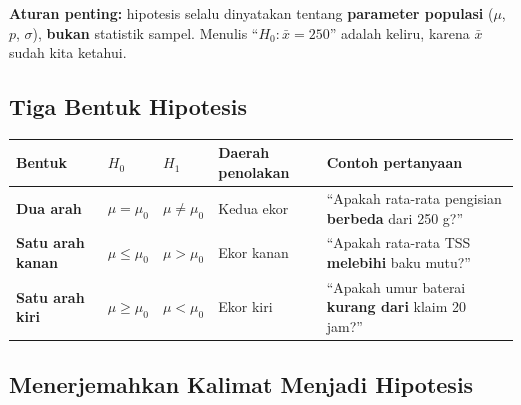 \documentclass[
  indonesian,
  letterpaper,
]{book}
\newcounter{none} %
\begin{document}
\textbf{Aturan penting:} hipotesis selalu dinyatakan tentang
\textbf{parameter populasi} (\(\mu\), \(p\), \(\sigma\)), \textbf{bukan}
statistik sampel. Menulis ``\(H_0: \bar{x} = 250\)'' adalah keliru,
karena \(\bar{x}\) sudah kita ketahui.

\subsection{Tiga Bentuk Hipotesis}\label{tiga-bentuk-hipotesis}

{\def\LTcaptype{none} %
\begin{longtable}[]{@{}
  >{\raggedright\arraybackslash}p{}
  >{\raggedright\arraybackslash}p{}
  >{\raggedright\arraybackslash}p{}
  >{\raggedright\arraybackslash}p{}
  >{\raggedright\arraybackslash}p{}@{}}
\toprule\noalign{}
\begin{minipage}[b]{\linewidth}\raggedright
Bentuk
\end{minipage} & \begin{minipage}[b]{\linewidth}\raggedright
\(H_0\)
\end{minipage} & \begin{minipage}[b]{\linewidth}\raggedright
\(H_1\)
\end{minipage} & \begin{minipage}[b]{\linewidth}\raggedright
Daerah penolakan
\end{minipage} & \begin{minipage}[b]{\linewidth}\raggedright
Contoh pertanyaan
\end{minipage} \\
\midrule\noalign{}
\endhead
\bottomrule\noalign{}
\endlastfoot
\textbf{Dua arah} & \(\mu = \mu_0\) & \(\mu \ne \mu_0\) & Kedua ekor &
``Apakah rata-rata pengisian \textbf{berbeda} dari 250 g?'' \\
\textbf{Satu arah kanan} & \(\mu \le \mu_0\) & \(\mu > \mu_0\) & Ekor
kanan & ``Apakah rata-rata TSS \textbf{melebihi} baku mutu?'' \\
\textbf{Satu arah kiri} & \(\mu \ge \mu_0\) & \(\mu < \mu_0\) & Ekor
kiri & ``Apakah umur baterai \textbf{kurang dari} klaim 20 jam?'' \\
\end{longtable}
}

\subsection{Menerjemahkan Kalimat Menjadi
Hipotesis}\label{menerjemahkan-kalimat-menjadi-hipotesis}
\end{document}

